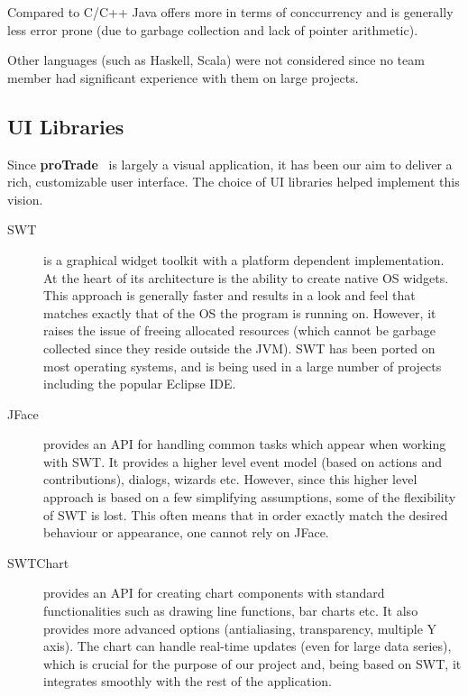 \documentclass[10pt]{report}
\newcommand{\nm}{{\bf proTrade}}
\newcommand{\nmsp}{{\nm \ }}
\begin{document}
Compared to C/C++ Java offers more in terms of conccurrency and is generally less error prone (due to garbage collection and lack of pointer arithmetic).

Other languages (such as Haskell, Scala) were not considered since no team member had significant experience with them on large projects.

\subsection{UI Libraries} 

Since {\nmsp} is largely a visual application, it has been our aim to deliver a rich, customizable user interface. The choice of UI libraries helped implement this vision.

\begin{description}

\item[SWT] is a graphical widget toolkit with a platform dependent implementation. At the heart of its architecture is the ability to create native OS widgets. This approach is generally faster and results in a look and feel that matches exactly that of the OS the program is running on. However, it raises the issue of freeing allocated resources (which cannot be garbage collected since they reside outside the JVM). SWT has been ported on most operating systems, and is being used in a large number of projects including the popular Eclipse IDE.

\item[JFace] provides an API for handling common tasks which appear when working with SWT. It provides a higher level event model (based on actions and contributions), dialogs, wizards etc. However, since this higher level approach is based on a few simplifying assumptions, some of the flexibility of SWT is lost. This often means that in order exactly match the desired behaviour or appearance, one cannot rely on JFace.

\item[SWTChart] provides an API for creating chart components with standard functionalities such as drawing line functions, bar charts etc. It also provides more advanced options (antialiasing, transparency, multiple Y axis). The chart can handle real-time updates (even for large data series), which is crucial for the purpose of our project and, being based on SWT, it integrates smoothly with the rest of the application. 

\end{description}
\end{document}
